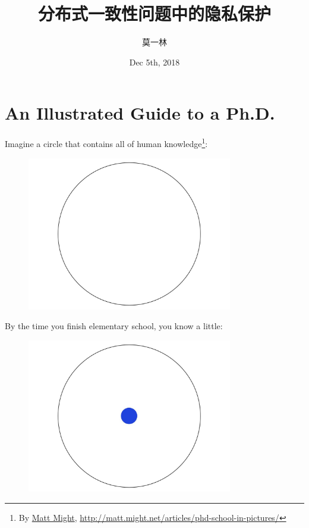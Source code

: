 \documentclass[10pt]{beamer}
\title[Private Consensus]{分布式一致性问题中的隐私保护}
\author[Yilin Mo]{莫一林}
\institute[Tsinghua]{
  清华大学 自动化系
}
\date[Dec 5th, 2018]{Dec 5th, 2018}
\begin{document}
\maketitle 
\section{An Illustrated Guide to a Ph.D.}

\begin{frame}{}
  Imagine a circle that contains all of human knowledge\footnote{By \href{http://matt.might.net/}{Matt Might}, \url{http://matt.might.net/articles/phd-school-in-pictures/}}:

  \begin{figure}[hb]
    \centering
    \includegraphics[width=0.8\textwidth]{images/PhDKnowledge-001.png}
  \end{figure}
\end{frame}


\begin{frame}{}
  By the time you finish elementary school, you know a little:
  \begin{figure}[hb]
    \centering
    \includegraphics[width=0.8\textwidth]{images/PhDKnowledge-002.png}
  \end{figure}
\end{frame}
\end{document}
